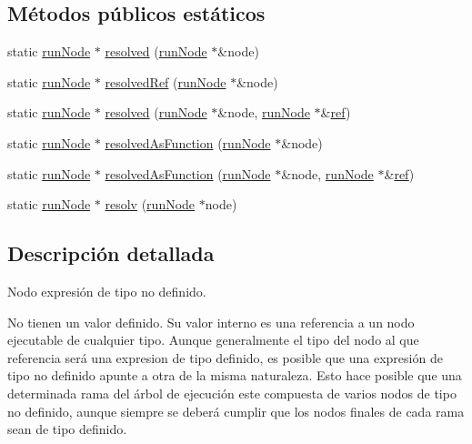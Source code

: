 \subsection*{Métodos públicos estáticos}
\begin{DoxyCompactItemize}
\item 
static \hyperlink{classrunNode}{run\-Node} $\ast$ \hyperlink{classnexpNode_a4430d227ba9162fe6361e44d6b683445}{resolved} (\hyperlink{classrunNode}{run\-Node} $\ast$\&node)
\item 
static \hyperlink{classrunNode}{run\-Node} $\ast$ \hyperlink{classnexpNode_a155b43d9cdaadd5c99738cb5bb2b4a21}{resolved\-Ref} (\hyperlink{classrunNode}{run\-Node} $\ast$\&node)
\item 
static \hyperlink{classrunNode}{run\-Node} $\ast$ \hyperlink{classnexpNode_a50cc8b05927a8b70542a45d137f144ab}{resolved} (\hyperlink{classrunNode}{run\-Node} $\ast$\&node, \hyperlink{classrunNode}{run\-Node} $\ast$\&\hyperlink{classnexpNode_a9cfb7bb942f2c522cd43cd4cf344796e}{ref})
\item 
static \hyperlink{classrunNode}{run\-Node} $\ast$ \hyperlink{classnexpNode_aa4fa13afe75b5eb15968596b97030711}{resolved\-As\-Function} (\hyperlink{classrunNode}{run\-Node} $\ast$\&node)
\item 
static \hyperlink{classrunNode}{run\-Node} $\ast$ \hyperlink{classnexpNode_ad3c52fe03ab859afdfcd307d0f3db99f}{resolved\-As\-Function} (\hyperlink{classrunNode}{run\-Node} $\ast$\&node, \hyperlink{classrunNode}{run\-Node} $\ast$\&\hyperlink{classnexpNode_a9cfb7bb942f2c522cd43cd4cf344796e}{ref})
\item 
static \hyperlink{classrunNode}{run\-Node} $\ast$ \hyperlink{classnexpNode_a84b5403ba034c1e195c031e074384576}{resolv} (\hyperlink{classrunNode}{run\-Node} $\ast$node)
\end{DoxyCompactItemize}


\subsection{Descripción detallada}
Nodo expresión de tipo no definido. 

No tienen un valor definido. Su valor interno es una referencia a un nodo ejecutable de cualquier tipo. Aunque generalmente el tipo del nodo al que referencia será una expresion de tipo definido, es posible que una expresión de tipo no definido apunte a otra de la misma naturaleza. Esto hace posible que una determinada rama del árbol de ejecución este compuesta de varios nodos de tipo no definido, aunque siempre se deberá cumplir que los nodos finales de cada rama sean de tipo definido.

